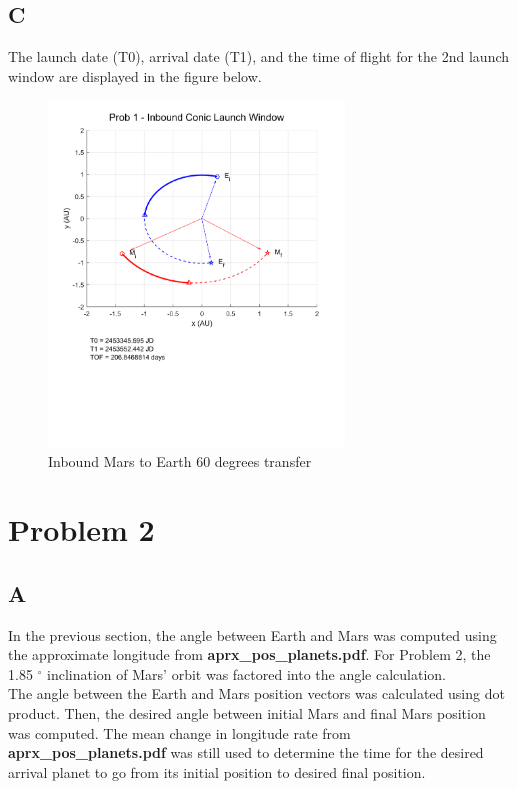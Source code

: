 \documentclass[conf]{new-aiaa}
\begin{document}
\subsection*{C}

The launch date (T0), arrival date (T1), and the time of flight for the 2nd launch window are displayed in the figure below. 

\begin{figure}[H]
    \centering 
    \includegraphics[width=0.7\textwidth]{Prob 1 - Inbound Conic Launch Window.pdf}
    \caption{Inbound Mars to Earth 60 degrees transfer}
\end{figure}

\section*{Problem 2}

\subsection*{A}
In the previous section, the angle between Earth and Mars was computed using the approximate longitude from \textbf{aprx\_pos\_planets.pdf}. For Problem 2, the 1.85 $^\circ$ inclination of Mars' orbit was factored into the angle calculation. \\ 

The angle between the Earth and Mars position vectors was calculated using dot product. Then, the desired angle between initial Mars and final Mars position was computed. The mean change in longitude rate from \textbf{aprx\_pos\_planets.pdf} was still used to determine the time for the desired arrival planet to go from its initial position to desired final position. \\ 
\end{document}
